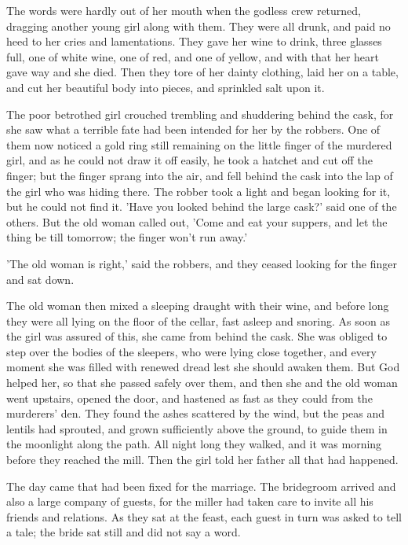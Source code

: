 \documentclass[12pt]{book}
\begin{document}
The words were hardly out of her mouth when the godless crew returned,
dragging another young girl along with them. They were all drunk, and
paid no heed to her cries and lamentations. They gave her wine to
drink, three glasses full, one of white wine, one of red, and one of
yellow, and with that her heart gave way and she died. Then they tore
of her dainty clothing, laid her on a table, and cut her beautiful
body into pieces, and sprinkled salt upon it.

The poor betrothed girl crouched trembling and shuddering behind the
cask, for she saw what a terrible fate had been intended for her by
the robbers. One of them now noticed a gold ring still remaining on
the little finger of the murdered girl, and as he could not draw it
off easily, he took a hatchet and cut off the finger; but the finger
sprang into the air, and fell behind the cask into the lap of the girl
who was hiding there. The robber took a light and began looking for
it, but he could not find it. 'Have you looked behind the large cask?'
said one of the others. But the old woman called out, 'Come and eat
your suppers, and let the thing be till tomorrow; the finger won't run
away.'

'The old woman is right,' said the robbers, and they ceased looking
for the finger and sat down.

The old woman then mixed a sleeping draught with their wine, and
before long they were all lying on the floor of the cellar, fast
asleep and snoring. As soon as the girl was assured of this, she came
from behind the cask. She was obliged to step over the bodies of the
sleepers, who were lying close together, and every moment she was
filled with renewed dread lest she should awaken them. But God helped
her, so that she passed safely over them, and then she and the old
woman went upstairs, opened the door, and hastened as fast as they
could from the murderers' den. They found the ashes scattered by the
wind, but the peas and lentils had sprouted, and grown sufficiently
above the ground, to guide them in the moonlight along the path. All
night long they walked, and it was morning before they reached the
mill. Then the girl told her father all that had happened.

The day came that had been fixed for the marriage. The bridegroom
arrived and also a large company of guests, for the miller had taken
care to invite all his friends and relations. As they sat at the
feast, each guest in turn was asked to tell a tale; the bride sat
still and did not say a word.
\end{document}
